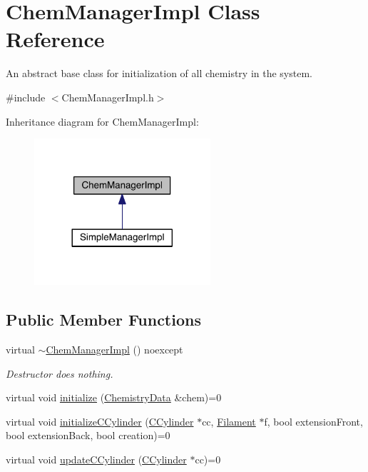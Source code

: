 \hypertarget{classChemManagerImpl}{\section{Chem\+Manager\+Impl Class Reference}
\label{classChemManagerImpl}
}


An abstract base class for initialization of all chemistry in the system.  




{\ttfamily \#include $<$Chem\+Manager\+Impl.\+h$>$}



Inheritance diagram for Chem\+Manager\+Impl\+:\nopagebreak
\begin{figure}[H]
\begin{center}
\leavevmode
\includegraphics[width=185pt]{classChemManagerImpl__inherit__graph}
\end{center}
\end{figure}
\subsection*{Public Member Functions}
\begin{DoxyCompactItemize}
\item 
virtual \hyperlink{classChemManagerImpl_a87a97fda042c8f326793321e2bc28e69}{$\sim$\+Chem\+Manager\+Impl} () noexcept
\begin{DoxyCompactList}\small\item\em Destructor does nothing. \end{DoxyCompactList}\item 
virtual void \hyperlink{classChemManagerImpl_a5b71cbf0b7919d573b6d7b148eb52d0a}{initialize} (\hyperlink{structChemistryData}{Chemistry\+Data} \&chem)=0
\item 
virtual void \hyperlink{classChemManagerImpl_af40877d374e6792e8a0c927acce43a06}{initialize\+C\+Cylinder} (\hyperlink{classCCylinder}{C\+Cylinder} $\ast$cc, \hyperlink{classFilament}{Filament} $\ast$f, bool extension\+Front, bool extension\+Back, bool creation)=0
\item 
virtual void \hyperlink{classChemManagerImpl_a49530caf0062fa43dfd0123b30b22011}{update\+C\+Cylinder} (\hyperlink{classCCylinder}{C\+Cylinder} $\ast$cc)=0
\end{DoxyCompactItemize}



